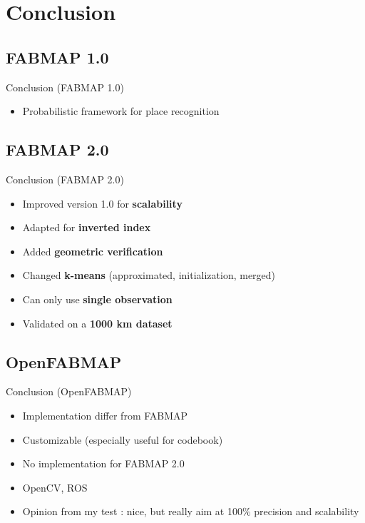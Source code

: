 \section{Conclusion}

\subsection{FABMAP 1.0}
\begin{frame}{Conclusion (FABMAP 1.0)}
    \begin{itemize}
        \item Probabilistic framework for place recognition
    \end{itemize}
\end{frame}

\subsection{FABMAP 2.0}
\begin{frame}{Conclusion (FABMAP 2.0)}
    \begin{itemize}
        \item Improved version 1.0 for \textbf{scalability}
        \item Adapted for \textbf{inverted index}
        \item Added \textbf{geometric verification}
        \item Changed \textbf{k-means} (approximated, initialization, merged)
        \item Can only use \textbf{single observation}
        \item Validated on a \textbf{1000 km dataset}
    \end{itemize}
\end{frame}

\subsection{OpenFABMAP}
\begin{frame}{Conclusion (OpenFABMAP)}
    \begin{itemize}
        \item Implementation differ from FABMAP
        \item Customizable (especially useful for codebook)
        \item No implementation for FABMAP 2.0
        \item OpenCV, ROS
        \item Opinion from my test : nice, but really aim at 100\% precision and scalability
    \end{itemize}
\end{frame}

